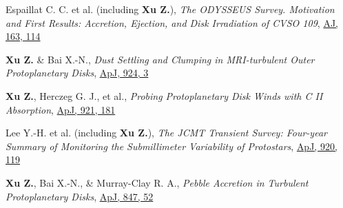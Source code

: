 \documentclass{resume} %
\begin{document}
\begin{rSectionLink}
\begin{list}{}
\item[2022] Espaillat C. C. et al. (including \textbf{Xu Z.}), \emph{The ODYSSEUS Survey. Motivation and First Results: Accretion, Ejection, and Disk Irradiation of CVSO 109}, \href{https://ui.adsabs.harvard.edu/abs/2022AJ....163..114E/abstract}{AJ, 163, 114}

\item[2022] \textbf{Xu Z.} \& Bai X.-N., \emph{Dust Settling and Clumping in MRI-turbulent Outer Protoplanetary Disks}, \href{https://ui.adsabs.harvard.edu/abs/2022ApJ...924....3X/abstract}{ApJ, 924, 3}

\item[2021] \textbf{Xu Z.}, Herczeg G. J., et al., \emph{Probing Protoplanetary Disk Winds with C II Absorption}, \href{https://ui.adsabs.harvard.edu/abs/2021ApJ...921..181X/abstract}{ApJ, 921, 181}

\item[2021] Lee Y.-H. et al. (including \textbf{Xu Z.}), \emph{The JCMT Transient Survey: Four-year Summary of Monitoring the Submillimeter Variability of Protostars}, \href{https://ui.adsabs.harvard.edu/abs/2021ApJ...920..119L/abstract}{ApJ, 920, 119}

\item[2017] \textbf{Xu Z.}, Bai X.-N., \& Murray-Clay R. A., \emph{Pebble Accretion in Turbulent Protoplanetary Disks}, \href{https://ui.adsabs.harvard.edu/abs/2017ApJ...847...52X/abstract}{ApJ, 847, 52}
\end{list}
\end{rSectionLink}
\end{document}
